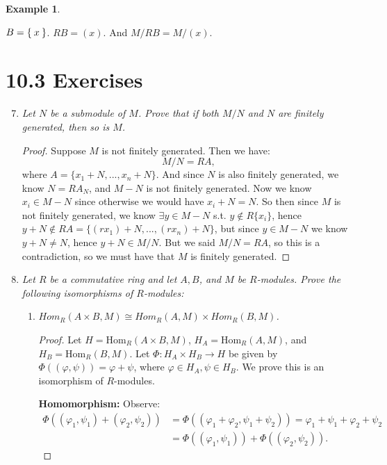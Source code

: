 \documentclass[12pt]{amsbook}
\theoremstyle{plain}
\numberwithin{section}{chapter}
\numberwithin{equation}{chapter}
\theoremstyle{definition}
\newtheorem{Ex}[theorem]{Example}
\theoremstyle{remark}
\renewcommand{\phi}{\varphi}
\begin{document}
\begin{Ex}
\begin{center}
\begin{tikzpicture}[y=0.80pt, x=0.80pt, yscale=-2.000000, xscale=2.000000, inner sep=0pt, outer sep=0pt]
\end{tikzpicture}

\end{center}




$B = \Set{x}$. $RB = (x)$. And $M/RB = M/(x)$. 
\end{Ex}



\section*{10.3 Exercises}
\begin{enumerate}[label=\arabic*.]
\setcounter{enumi}{6}
\item \textit{Let $N$ be a submodule of $M$. Prove that if both $M/N$ and $N$ are finitely generated, then so is $M$. }
\begin{proof}
Suppose $M$ is not finitely generated. Then we have:
$$
M/N = RA,
$$
where $A = \{x_1 + N,...,x_n + N\}$. And since $N$ is also finitely generated, we know $N = RA_N$, and $M -N$ is not finitely generated. 
Now we know $x_i \in M - N$ since otherwise we would have $x_i + N = N$. So then since $M$ is not finitely generated, we know $\exists y \in M - N$ s.t. $y \notin R\{x_i\}$, hence $y + N \notin RA = \{(rx_1) + N,...,(rx_n)+ N\}$, but since $y \in M - N$ we know $y + N \neq N$, hence $y + N \in M/N$. But we said $M/N = RA$, so this is a contradiction, so we must have that $M$ is finitely generated. 
\end{proof}

\setcounter{enumi}{11}
\item \textit{Let $R$ be a commutative ring and let $A,B$, and $M$ be $R$-modules. Prove the following isomorphisms of $R$-modules: }
\begin{enumerate}
\item \textit{$Hom_R(A\times B,M) \cong Hom_R(A,M) \times Hom_R(B,M)$.}
\begin{proof}
Let $H = \text{Hom}_R(A\times B,M)$, $H_A = \text{Hom}_R(A,M)$, and $H_B = \text{Hom}_R(B,M)$. Let $\Phi: H_A \times H_B\to H$ be given by $\Phi((\phi,\psi)) = \phi + \psi$, where $\phi \in H_A,\psi \in H_B$. We prove this is an isomorphism of $R$-modules. 

\textbf{Homomorphism: }Observe: 
\begin{equation}
\begin{aligned}
\Phi((\phi_1,\psi_1) + (\phi_2,\psi_2)) &= \Phi((\phi_1 + \phi_2,\psi_1 + \psi_2)) = \phi_1 + \psi_1 + \phi_2 + \psi_2\\ &= \Phi((\phi_1,\psi_1)) + \Phi((\phi_2,\psi_2)).
\end{aligned}
\end{equation}


\end{proof}
\end{enumerate}
\end{enumerate}
\end{document}
